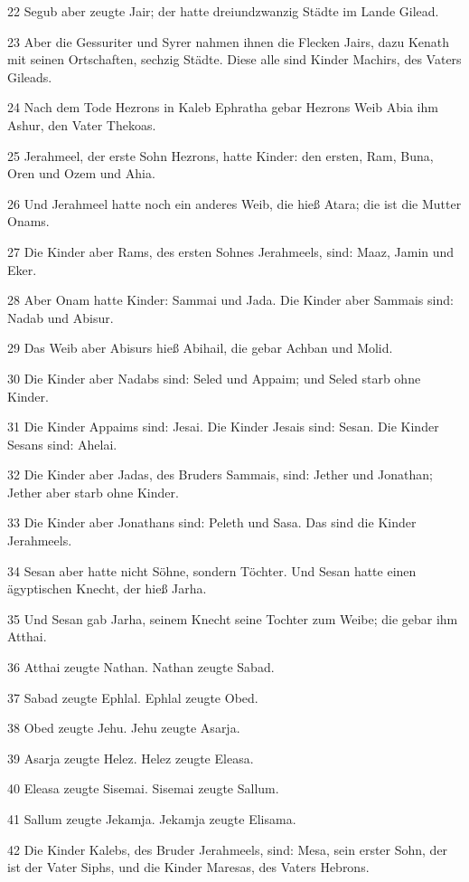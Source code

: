 \par 22 Segub aber zeugte Jair; der hatte dreiundzwanzig Städte im Lande Gilead.
\par 23 Aber die Gessuriter und Syrer nahmen ihnen die Flecken Jairs, dazu Kenath mit seinen Ortschaften, sechzig Städte. Diese alle sind Kinder Machirs, des Vaters Gileads.
\par 24 Nach dem Tode Hezrons in Kaleb Ephratha gebar Hezrons Weib Abia ihm Ashur, den Vater Thekoas.
\par 25 Jerahmeel, der erste Sohn Hezrons, hatte Kinder: den ersten, Ram, Buna, Oren und Ozem und Ahia.
\par 26 Und Jerahmeel hatte noch ein anderes Weib, die hieß Atara; die ist die Mutter Onams.
\par 27 Die Kinder aber Rams, des ersten Sohnes Jerahmeels, sind: Maaz, Jamin und Eker.
\par 28 Aber Onam hatte Kinder: Sammai und Jada. Die Kinder aber Sammais sind: Nadab und Abisur.
\par 29 Das Weib aber Abisurs hieß Abihail, die gebar Achban und Molid.
\par 30 Die Kinder aber Nadabs sind: Seled und Appaim; und Seled starb ohne Kinder.
\par 31 Die Kinder Appaims sind: Jesai. Die Kinder Jesais sind: Sesan. Die Kinder Sesans sind: Ahelai.
\par 32 Die Kinder aber Jadas, des Bruders Sammais, sind: Jether und Jonathan; Jether aber starb ohne Kinder.
\par 33 Die Kinder aber Jonathans sind: Peleth und Sasa. Das sind die Kinder Jerahmeels.
\par 34 Sesan aber hatte nicht Söhne, sondern Töchter. Und Sesan hatte einen ägyptischen Knecht, der hieß Jarha.
\par 35 Und Sesan gab Jarha, seinem Knecht seine Tochter zum Weibe; die gebar ihm Atthai.
\par 36 Atthai zeugte Nathan. Nathan zeugte Sabad.
\par 37 Sabad zeugte Ephlal. Ephlal zeugte Obed.
\par 38 Obed zeugte Jehu. Jehu zeugte Asarja.
\par 39 Asarja zeugte Helez. Helez zeugte Eleasa.
\par 40 Eleasa zeugte Sisemai. Sisemai zeugte Sallum.
\par 41 Sallum zeugte Jekamja. Jekamja zeugte Elisama.
\par 42 Die Kinder Kalebs, des Bruder Jerahmeels, sind: Mesa, sein erster Sohn, der ist der Vater Siphs, und die Kinder Maresas, des Vaters Hebrons.
